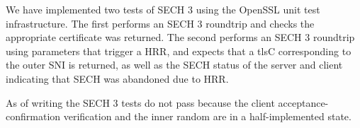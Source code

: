 We have implemented two tests of \ac{SECH} 3 using the OpenSSL unit test infrastructure.
The first performs an \ac{SECH} 3 roundtrip and checks the appropriate certificate was returned.
The second performs an \ac{SECH} 3 roundtrip
using parameters that trigger a \ac{HRR},
and expects that a \ac{tlsC} corresponding to the outer \ac{SNI} is returned, as well as
the \ac{SECH} status of the server and client indicating that \ac{SECH} was abandoned due to \ac{HRR}.

As of writing the \ac{SECH} 3 tests do not pass because the client acceptance-confirmation verification
and the inner random are in a half-implemented state.